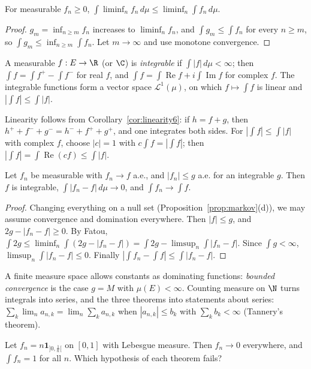 \begin{theorem}\label{thm:fatou6}
For measurable $f_n\ge0$, $\int\liminf_nf_n\,d\mu\le\liminf_n\int f_n\,d\mu$.
\end{theorem}
\begin{proof}
$g_m=\inf_{n\ge m}f_n$ increases to $\liminf_nf_n$, and $\int g_m\le\int f_n$ for every $n\ge m$, so $\int g_m\le\inf_{n\ge m}\int f_n$. Let $m\to\infty$ and use monotone convergence.
\end{proof}

\begin{definition}
A measurable $f:E\to\R$ (or $\C$) is \emph{integrable} if $\int|f|\,d\mu<\infty$; then $\int f=\int f^+-\int f^-$ for real $f$, and $\int f=\int\operatorname{Re}f+i\int\operatorname{Im}f$ for complex $f$. The integrable functions
form a vector space $\mathcal L^1(\mu)$, on which $f\mapsto\int f$ is linear and $|\int f|\le\int|f|$.
\end{definition}

Linearity follows from Corollary~\ref{cor:linearity6}: if $h=f+g$, then $h^++f^-+g^-=h^-+f^++g^+$, and one integrates both sides. For $|\int f|\le\int|f|$ with complex $f$, choose $|c|=1$
with $c\int f=|\int f|$; then $|\int f|=\int\operatorname{Re}(cf)\le\int|f|$.

\begin{theorem}\label{thm:dct6}
Let $f_n$ be measurable with $f_n\to f$ a.e., and $|f_n|\le g$ a.e. for an integrable $g$. Then $f$ is integrable, $\int|f_n-f|\,d\mu\to0$, and $\int f_n\to\int f$.
\end{theorem}
\begin{proof}
Changing everything on a null set (Proposition~\ref{prop:markov}(d)), we may assume convergence and domination everywhere. Then $|f|\le g$, and $2g-|f_n-f|\ge0$. By
Fatou, $\int2g\le\liminf_n\int(2g-|f_n-f|)=\int2g-\limsup_n\int|f_n-f|$. Since $\int g<\infty$, $\limsup_n\int|f_n-f|\le0$. Finally $|\int f_n-\int f|\le\int|f_n-f|$.
\end{proof}

A finite measure space allows constants as dominating functions: \emph{bounded convergence} is the case $g=M$ with $\mu(E)<\infty$. Counting measure on $\N$ turns integrals
into series, and the three theorems into statements about series: $\sum_k\lim_na_{n,k}=\lim_n\sum_ka_{n,k}$ when $|a_{n,k}|\le b_k$ with $\sum_kb_k<\infty$ (Tannery's theorem).

\begin{think}
Let $f_n=n\mathbf 1_{]0,\frac1n[}$ on $[0,1]$ with Lebesgue measure. Then $f_n\to0$ everywhere, and $\int f_n=1$ for all $n$. Which hypothesis of each theorem fails?
\end{think}

